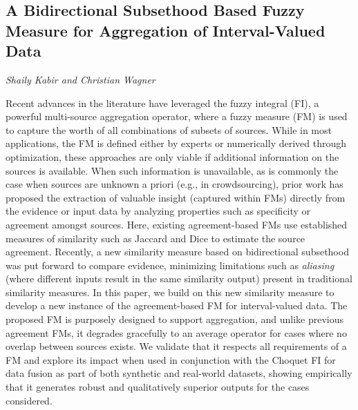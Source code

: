 \documentclass[../booklet.tex]{subfiles}
\begin{document}
\subsection[A Bidirectional Subsethood Based Fuzzy Measure for Aggregation of Interval-Valued Data. {\it Shaily Kabir and Christian Wagner}]{A Bidirectional Subsethood Based Fuzzy Measure for Aggregation of Interval-Valued Data}
 

\begin{center}
  {\it Shaily Kabir and Christian Wagner}
\end{center}

\vskip 0.8cm


Recent advances in the literature have leveraged the fuzzy integral (FI), a powerful multi-source aggregation operator,  where a fuzzy measure (FM) is used to capture the worth of all combinations of subsets of sources. While in most applications, the FM is defined either by experts or numerically derived through optimization, these approaches are only viable if additional information on the sources is available. When such information is unavailable, as is commonly the case when sources are unknown a priori (e.g., in crowdsourcing), prior work has proposed the extraction of valuable insight (captured within FMs) directly from the evidence or input data by analyzing properties such as specificity or agreement amongst sources. Here, existing agreement-based FMs use established measures of similarity such as Jaccard and Dice to estimate the source agreement. Recently, a new similarity measure based on bidirectional subsethood was put forward to compare evidence, minimizing limitations such as \emph{aliasing} (where different inputs result in the same similarity output) present in traditional similarity measures. In this paper, we build on this new similarity measure to develop a new instance of the agreement-based FM for interval-valued data. The proposed FM is purposely designed to support aggregation, and unlike previous agreement FMs, it degrades gracefully to an average operator for cases where no overlap between sources exists. We validate that it respects all requirements of a FM and explore its impact when used in conjunction with the Choquet FI for data fusion as part of both synthetic and real-world datasets, showing empirically that it generates robust and qualitatively superior outputs for the cases considered.

\end{document}
